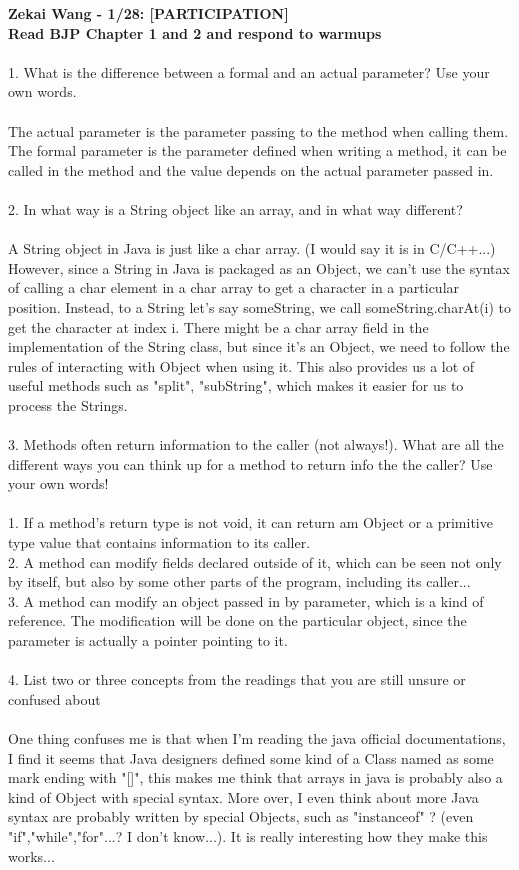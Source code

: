 \documentclass[12pt]{article}
\begin{document}
\setmainfont{Times New Roman}
\noindent
\textbf{Zekai Wang - 1/28: [PARTICIPATION] \\Read BJP Chapter 1 and 2 and respond to warmups\\}
\\[0pt]
1. What is the difference between a formal and an actual parameter? Use your own words.\\
\\[0pt]
The actual parameter is the parameter passing to the method when calling them.\\
The formal parameter is the parameter defined when writing a method, it can be called in the method and the value depends on the actual parameter passed in.\\
\\[0pt]
2. In what way is a String object like an array, and in what way different?\\
\\[0pt]
A String object in Java is just like a char array. (I would say it is in C/C++...) However, since a String in Java is packaged as an Object, we can't use 
the syntax of calling a char element in a char array to get a character in a particular position. Instead, to a String let's say someString, we call 
someString.charAt(i) to get the character at index i. There might be a char array field in the implementation of the String class, but since it's an 
Object, we need to follow the rules of interacting with Object when using it. This also provides us a lot of useful methods such as "split", "subString", 
which makes it easier for us to process the Strings.\\
\\[0pt]
3. Methods often return information to the caller (not always!). What are all the different ways you can think up for a method to return info the the caller? Use your own words!\\
\\[0pt]
1. If a method's return type is not void, it can return am Object or a primitive type value that contains information to its caller.\\
2. A method can modify fields declared outside of it, which can be seen not only by itself, but also by some other parts of the program, including its caller...\\
3. A method can modify an object passed in by parameter, which is a kind of reference. The modification will be done on the particular object, since the parameter 
   is actually a pointer pointing to it.\\
\\[0pt]
4. List two or three concepts from the readings that you are still unsure or confused about\\
\\[0pt]
One thing confuses me is that when I'm reading the java official documentations, I find it seems that Java designers defined some kind of a Class named as some mark 
ending with "[]", this makes me think that arrays in java is probably also a kind of Object with special syntax. More over, I even think about more Java syntax are 
probably written by special Objects, such as "instanceof" ? (even "if","while","for"...? I don't know...). It is really interesting how they make this works...
\end{document}
